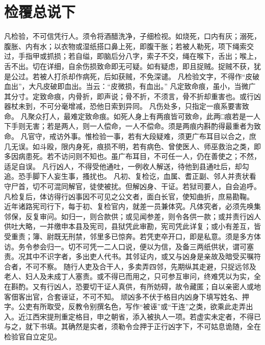 \documentclass[12pt,UTF8]{ctexbook}
\begin{document}
\chapter{检覆总说下}

凡检验，不可信凭行人。须令将酒醋洗净，子细检视。如烧死，口内有灰；溺死，腹胀、内有水；以衣物或湿纸搭口鼻上死，即腹干胀；若被人勒死，项下绳索交过，手指甲或抓损；若自缢，即脑后分八字，索子不交，绳在喉下，舌出；喉上，舌不出。切在详细，自余伤损致命即无可疑。如有疑虑，即且捉贼。捉贼不获，犹是公过。若被人打杀却作病死，后如获贼，不免深谴。
凡检验文字，不得作“皮破血出”，大凡皮破即血出。当云：“皮微损，有血出。”
凡定致命痕，虽小，当微广其分寸。定致命痕，内骨折，即声说；骨不折，不须言，骨不折却重害也。或行凶器杖未到，不可分毫增减，恐他日索到异同。
凡伤处多，只指定一痕系要害致命。
凡聚众打人，最难定致命痕。如死人身上有两痕皆可致命，此两□痕若是一人下手则无害；若是两人，则一人偿命，一人不偿命。须是两痕内斟酌得最重者为致命。
凡官守，戒访外事。惟检验一事，若有大段疑难，须更广布耳目以合之，庶几无误。如斗殴，限内身死，痕损不明，若有病色、曾使医人、师巫救治之类，即多因病患死。若不访问则不知也。虽广布耳目，不可任一人，仍在善使之；不然，适足自误。
凡行凶人，不得受他通吐，一例收人解送，待他到县通吐后，却勾追。恐手脚下人妄生事，搔扰也。
凡初、复检讫，血属、耆正副、邻人并责状看守尸首，切不可混同解官，徒使被扰。但解凶身、干证。若狱司要人，自会追呼。
凡检复后，体访得行凶事因不可见之公文者，面白长官，使知曲折，庶易勘鞠。
近年诸路宪司行下，每于初、复检官内，就差一员兼体究。凡体究者，必须先唤集邻保，反复审问。如归一，则合款供；或见闻参差，则令各供一款；或并责行凶人供吐大略，一并缴申本县及宪司，县狱凭此审勘，宪司凭此详复；或小有差互，皆受重责；簿、尉既无刑禁，邻里多已惊奔。若凭吏卒开口，即是私意。须是多方体访。务令参会归一。切不可凭一二人口说，便以为信，及备三两纸供状，谓可塞责。况其中不识字者，多出吏人代书。其邻证内，或又与凶身是亲故及暗受买嘱符合者，不可不察。
随行人吏及合干人，多卖弄四邻，先期纵其走避，只捉远邻及老人、妇人及未成丁人塞责。或不得已而用之，只可参互审问，终难凭以为实，全在斟酌。又有行凶人，恐要切干证人真供，有所妨碍，故令藏匿；自以亲密人或地客佃客出官，合套诬证，不可不知。
顽凶多不伏于格目内凶身下填写姓名、押字。公吏有所取受，反教令别撰名色，写作“被诬”或“干连”之类，欲乘此走弄出入。近江西宋提刑重定格目，申之朝省，添入被执人一项。若虚实未定者，不得已与之，就下书填。其确然是实者，须勒令佥押于正行凶字下，不可姑息诡随，全在检验官自立定见。
\end{document}
